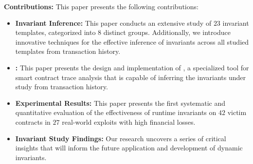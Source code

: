 \noindent \textbf{Contributions:} This paper presents the following contributions:
\begin{itemize}[leftmargin=*]
    \item \textbf{Invariant Inference:} This paper conducts an extensive study
        of $23$ invariant templates, categorized into $8$ distinct groups.
        Additionally, we introduce innovative techniques for the effective
        inference of invariants across all studied templates from transaction 
        history. 

    \item \textbf{{\name}:} This paper presents the design and implementation of {\name},
        a specialized tool for smart contract trace analysis that is capable of
        inferring the invariants under study from transaction history.

    \item \textbf{Experimental Results:} This paper presents the first
        systematic and quantitative evaluation of the effectiveness of runtime
        invariants on $42$ victim contracts in $27$ real-world exploits with high
        financial losses.
        

    \item \textbf{Invariant Study Findings:} Our research uncovers a series of
        critical insights that will inform the future application and
        development of dynamic invariants.
\end{itemize}

